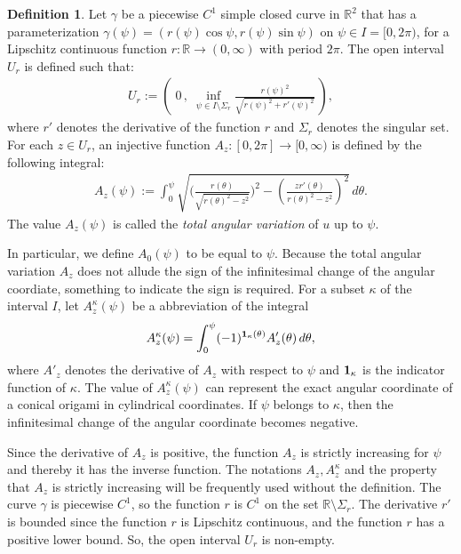 \documentclass{amsart}
\theoremstyle{plain}
\theoremstyle{definition}
\newtheorem*{definition}{Definition}
\theoremstyle{remark}
\begin{document}
\begin{definition}%
Let $\gamma$ be a piecewise $C^1$ simple closed curve in $\mathbb{R}^2$ that has a parameterization $\gamma(\psi)=(r(\psi)\cos\psi,r(\psi)\sin\psi)$ on $\psi\in I=[0,2\pi)$, for a Lipschitz continuous function $r:\mathbb{R}\to(0,\infty)$ with period $2\pi$.
The open interval $U_r$ is defined such that:
\begin{align*}
U_r:=\left(\;0\,,\;\inf_{\psi\in I\setminus\Sigma_r}\frac{r(\psi)^2}{\sqrt{r(\psi)^2+r'(\psi)^2}}\,\right),
\end{align*}
where $r'$ denotes the derivative of the function $r$ and $\Sigma_r$ denotes the singular set.
For each $z\in U_r$, an injective function  $A_z:[0,2\pi]\to[0,\infty)$ is defined by the following integral:
\begin{align*}
A_z(\psi):=\int_0^{\psi}\sqrt{\biggl(\frac{r(\theta)}{\sqrt{r(\theta)^2-z^2}}\biggr)^2-\left(\frac{zr'(\theta)}{r(\theta)^2-z^2}\right)^2}\,d\theta.
\end{align*}
The value $A_z(\psi)$ is called the \emph{total angular variation} of $u$ up to $\psi$.
\end{definition}


In particular, we define $A_0(\psi)$ to be equal to $\psi$.
Because the total angular variation $A_z$ does not allude the sign of the infinitesimal change of the angular coordiate, something to indicate the sign is required.
For a subset $\kappa$ of the interval $I$, let $A_z^{\kappa}(\psi)$ be a abbreviation of the integral
\begin{align*}
A_z^{\kappa}(\psi)=\int_0^{\psi}(-1)^{\bold{1}_{\kappa}(\theta)}A'_z(\theta)\,d\theta,
\end{align*}
where $A'_z$ denotes the derivative of $A_z$ with respect to $\psi$ and $\bold{1}_{\kappa}$ is the indicator function of $\kappa$.
The value of $A_z^{\kappa}(\psi)$ can represent the exact angular coordinate of a conical origami in cylindrical coordinates.
If $\psi$ belongs to $\kappa$, then the infinitesimal change of the angular coordinate becomes negative. 

Since the derivative of $A_z$ is positive, the function $A_z$ is strictly increasing for $\psi$ and thereby it has the inverse function.
The notations $A_z,A_z^{\kappa}$ and the property that $A_z$ is strictly increasing will be frequently used without the definition.
The curve $\gamma$ is piecewise $C^1$, so the function $r$ is $C^1$ on the set $\mathbb{R}\setminus\Sigma_r$.
The derivative $r'$ is bounded since the function $r$ is Lipschitz continuous, and the function $r$ has a positive lower bound.
So, the open interval $U_r$ is non-empty.
\end{document}
